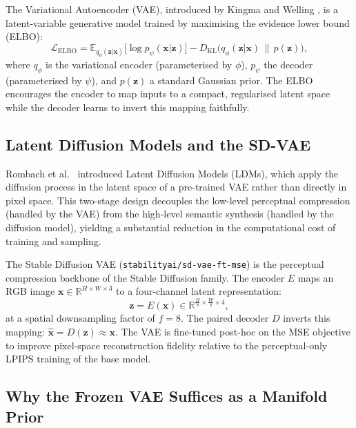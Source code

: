 \documentclass[12pt,a4paper]{report}
\begin{document}
The Variational Autoencoder (VAE), introduced by Kingma and Welling
\cite{kingma2014vae}, is a latent-variable generative model trained by
maximising the evidence lower bound (ELBO):
%
\begin{equation}
  \mathcal{L}_{\text{ELBO}} = \mathbb{E}_{q_\phi(\mathbf{z}|\mathbf{x})}
    \bigl[\log p_\psi(\mathbf{x}|\mathbf{z})\bigr]
    - D_{\text{KL}}\bigl(q_\phi(\mathbf{z}|\mathbf{x}) \,\|\, p(\mathbf{z})\bigr),
  \label{eq:elbo}
\end{equation}
%
where $q_\phi$ is the variational encoder (parameterised by $\phi$), $p_\psi$
the decoder (parameterised by $\psi$), and $p(\mathbf{z})$ a standard Gaussian
prior. The ELBO encourages the encoder to map inputs to a compact, regularised
latent space while the decoder learns to invert this mapping faithfully.

\subsection{Latent Diffusion Models and the SD-VAE}

Rombach et al.\ \cite{rombach2022high} introduced Latent Diffusion Models
(LDMs), which apply the diffusion process in the latent space of a
pre-trained VAE rather than directly in pixel space. This two-stage design
decouples the low-level perceptual compression (handled by the VAE) from the
high-level semantic synthesis (handled by the diffusion model), yielding a
substantial reduction in the computational cost of training and sampling.

The Stable Diffusion VAE (\texttt{stabilityai/sd-vae-ft-mse}) is the
perceptual compression backbone of the Stable Diffusion family. The encoder
$E$ maps an RGB image $\mathbf{x} \in \mathbb{R}^{H \times W \times 3}$ to a
four-channel latent representation:
%
\begin{equation}
  \mathbf{z} = E(\mathbf{x}) \in \mathbb{R}^{\frac{H}{8} \times \frac{W}{8} \times 4},
  \label{eq:vae_enc}
\end{equation}
%
at a spatial downsampling factor of $f = 8$. The paired decoder $D$ inverts
this mapping: $\hat{\mathbf{x}} = D(\mathbf{z}) \approx \mathbf{x}$.
The VAE is fine-tuned post-hoc on the MSE objective to improve pixel-space
reconstruction fidelity relative to the perceptual-only LPIPS training of the
base model.

\subsection{Why the Frozen VAE Suffices as a Manifold Prior}
\label{sec:n3}
\end{document}
